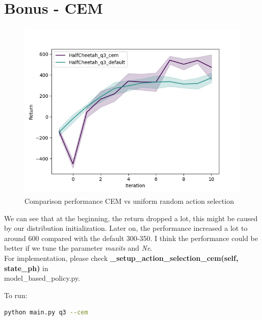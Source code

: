 \documentclass[12pt]{article}
\begin{document}
\newpage
\section*{Bonus - CEM}
\begin{figure}[H]
  \centering
  \includegraphics[height=3.4in]{HalfCheetah_q3_bonus.jpg}
  \caption{Comparison performance CEM vs uniform random action selection}
\end{figure}
We can see that at the beginning, the return dropped a lot, this might be caused by our distribution initialization. Later on, the performance increased a lot to around 600 compared with the default 300-350. I think the performance could be better if we tune the parameter \textit{maxits} and \textit{Ne}. \\

For implementation, please check \textbf{\_setup\_action\_selection\_cem(self, state\_ph)} in \\
model\_based\_policy.py.

To run:
\begin{lstlisting}[language=bash]
python main.py q3 --cem
\end{lstlisting}
\end{document}
